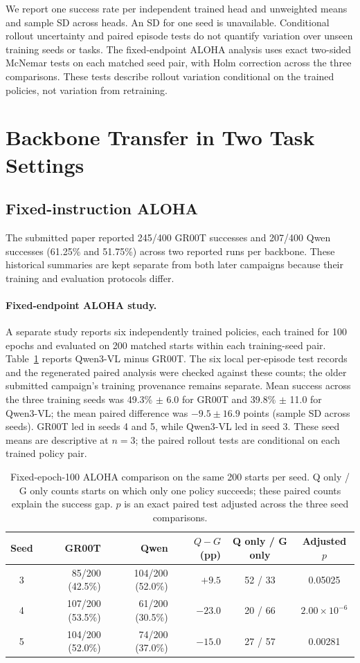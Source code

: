 \documentclass[conference]{IEEEtran}
\begin{document}
We report one success rate per independent trained head and unweighted means
and sample SD across heads. An SD for one seed is unavailable. Conditional
rollout uncertainty and paired episode tests do not quantify variation over
unseen training seeds or tasks. The fixed-endpoint ALOHA analysis uses exact
two-sided McNemar tests on each matched seed pair, with Holm correction across
the three comparisons. These tests describe rollout variation conditional on
the trained policies, not variation from retraining.

\section{Backbone Transfer in Two Task Settings}
\subsection{Fixed-instruction ALOHA}
The submitted paper reported 245/400 GR00T successes and 207/400 Qwen
successes (61.25\% and 51.75\%) across two reported runs per backbone. These
historical summaries are kept separate from both later campaigns because their
training and evaluation protocols differ.

\paragraph{Fixed-endpoint ALOHA study.}
A separate study reports six independently trained policies, each trained
for 100 epochs and evaluated on 200 matched starts within each training-seed pair.
Table~\ref{tab:aloha-matched}
reports Qwen3-VL minus GR00T. The six local per-episode test records and the
regenerated paired analysis were checked against these counts; the older
submitted campaign's training provenance remains separate.
Mean success across the three training seeds was
49.3\% $\pm$ 6.0 for GR00T and 39.8\% $\pm$ 11.0 for Qwen3-VL; the mean paired
difference was $-9.5\pm16.9$ points (sample SD across seeds). GR00T led in seeds
4 and 5, while Qwen3-VL led in seed 3. These seed means are descriptive at
$n=3$; the paired rollout tests are conditional on each trained policy pair.

\begin{table}[t]
\centering\small\setlength{\tabcolsep}{7pt}
\caption{Fixed-epoch-100 ALOHA comparison on the same 200 starts per seed.
Q only / G only counts starts on which only one policy succeeds; these
paired counts explain the success gap. $p$ is an exact paired test adjusted
across the three seed comparisons.}
\label{tab:aloha-matched}
\begin{tabular}{@{}crrrcc@{}}
\toprule
Seed & GR00T & Qwen & $Q-G$ (pp) & Q only / G only & Adjusted $p$ \\
\midrule
3 & 85/200 (42.5\%) & 104/200 (52.0\%) & $+9.5$ & 52 / 33 & 0.05025 \\
4 & 107/200 (53.5\%) & 61/200 (30.5\%) & $-23.0$ & 20 / 66 & $2.00\times10^{-6}$ \\
5 & 104/200 (52.0\%) & 74/200 (37.0\%) & $-15.0$ & 27 / 57 & 0.00281 \\
\bottomrule
\end{tabular}
\end{table}
\end{document}
